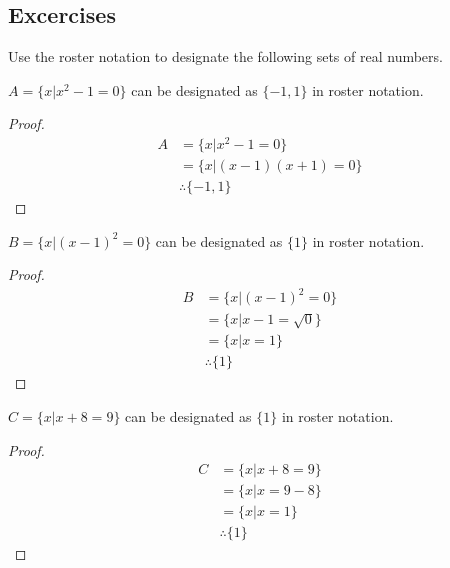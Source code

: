\setcounter{subsection}{4}
\subsection{Excercises}

\begin{question} Use the roster notation to designate the following sets of real numbers.
  \begin{subquestion}
    $A = \{ x | x^2 - 1 = 0\}$ can be designated as $\{-1, 1\}$ in roster notation.
  \end{subquestion}
  \begin{proof}
    \begin{equation}
      \begin{split}
        A & = \{x | x^2 - 1 = 0\} \\
        & = \{x | (x - 1)(x + 1) = 0\} \\
        & \therefore \{-1, 1\}
      \end{split}
    \end{equation}
  \end{proof}

  \begin{subquestion}
    $B = \{x | (x-1)^2 = 0\}$ can be designated as $\{1\}$ in roster notation.
  \end{subquestion}
  \begin{proof}
    \begin{equation}
      \begin{split}
        B & = \{x | (x-1)^2 = 0\} \\
        & = \{x | x-1 = \sqrt{0} \} \\
        & = \{x | x = 1 \} \\
        & \therefore \{1\}
      \end{split}
    \end{equation}
  \end{proof}

  \begin{subquestion}
    $C = \{x | x + 8 = 9\}$ can be designated as $\{ 1 \}$ in roster notation.
  \end{subquestion}
  \begin{proof}
    \begin{equation}
      \begin{split}
        C & = \{x | x + 8 = 9\} \\
        & = \{x | x = 9 - 8 \} \\
        & = \{x | x = 1 \} \\
        & \therefore \{ 1 \}
      \end{split}
    \end{equation}
  \end{proof}


\end{question}
